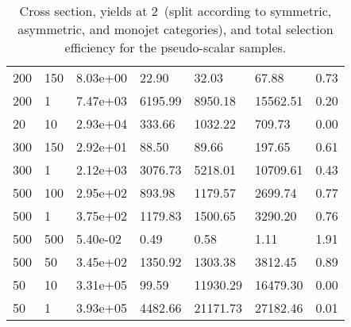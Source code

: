 \begin{table}
\begin{tabular}{lllllll}
200       &   150       &   8.03e+00  &   22.90     &   32.03     &   67.88     &   0.73      \\ 
200       &   1         &   7.47e+03  &   6195.99   &   8950.18   &   15562.51  &   0.20      \\ 
20        &   10        &   2.93e+04  &   333.66    &   1032.22   &   709.73    &   0.00      \\ 
300       &   150       &   2.92e+01  &   88.50     &   89.66     &   197.65    &   0.61      \\ 
300       &   1         &   2.12e+03  &   3076.73   &   5218.01   &   10709.61  &   0.43      \\ 
500       &   100       &   2.95e+02  &   893.98    &   1179.57   &   2699.74   &   0.77      \\ 
500       &   1         &   3.75e+02  &   1179.83   &   1500.65   &   3290.20   &   0.76      \\ 
500       &   500       &   5.40e-02  &   0.49      &   0.58      &   1.11      &   1.91      \\ 
500       &   50        &   3.45e+02  &   1350.92   &   1303.38   &   3812.45   &   0.89      \\ 
50        &   10        &   3.31e+05  &   99.59     &   11930.29  &   16479.30  &   0.00      \\ 
50        &   1         &   3.93e+05  &   4482.66   &   21171.73  &   27182.46  &   0.01      \\ 
\hline
\end{tabular}
\caption{Cross section, yields at 2~\ifb (split according to symmetric, asymmetric, and monojet categories), and total selection efficiency for the pseudo-scalar \DMtt samples.}
\label{tab:dm_DMttP_g1_2fb}
\end{table}
